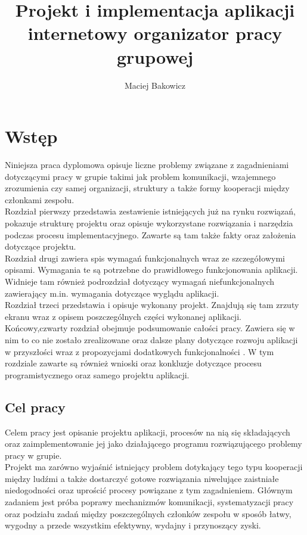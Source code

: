 \documentclass[eng,printmode]{mgr}
\title{Projekt i implementacja aplikacji internetowy organizator pracy grupowej }
\author{Maciej Bakowicz}
\begin{document}


\maketitle 

\tableofcontents 

\chapter{Wstęp}  
Niniejsza praca dyplomowa opisuje liczne problemy związane z zagadnieniami dotyczącymi pracy w grupie takimi jak problem komunikacji, wzajemnego zrozumienia czy samej organizacji, struktury a także formy kooperacji między członkami zespołu.
\\
Rozdział pierwszy przedstawia zestawienie istniejących już na rynku rozwiązań, pokazuje strukturę projektu oraz opisuje wykorzystane rozwiązania i narzędzia podczas procesu implementacyjnego. Zawarte są tam także fakty oraz założenia dotyczące projektu.
\\
Rozdział drugi zawiera spis wymagań funkcjonalnych wraz ze szczegółowymi opisami. Wymagania te są potrzebne do prawidłowego funkcjonowania aplikacji. Widnieje tam również podrozdział dotyczący wymagań niefunkcjonalnych zawierający m.in. wymagania dotyczące wyglądu aplikacji.
\\
Rozdział trzeci przedstawia i opisuje wykonany projekt. Znajdują się tam zrzuty ekranu wraz z opisem poszczególnych części wykonanej aplikacji.
\\
Końcowy,czwarty rozdział obejmuje podsumowanie całości pracy. Zawiera się w nim to co nie zostało zrealizowane oraz dalsze plany dotyczące rozwoju aplikacji w przyszłości wraz z propozycjami dodatkowych funkcjonalności . W tym rozdziale zawarte są również wnioski oraz konkluzje dotyczące procesu programistycznego oraz samego projektu aplikacji.

\section{Cel pracy}
Celem pracy jest opisanie projektu aplikacji, procesów na nią się składających oraz zaimplementowanie jej jako działającego programu rozwiązującego problemy pracy w grupie.
\\
Projekt ma zarówno wyjaśnić istniejący problem dotykający tego typu kooperacji między ludźmi a także dostarczyć gotowe rozwiązania niwelujące zaistniałe niedogodności oraz uprościć procesy powiązane z tym zagadnieniem. Głównym zadaniem jest próba poprawy mechanizmów komunikacji, systematyzacji pracy oraz podziału zadań między poszczególnych członków zespołu w sposób łatwy, wygodny a przede wszystkim efektywny, wydajny i przynoszący zyski.
\end{document}
